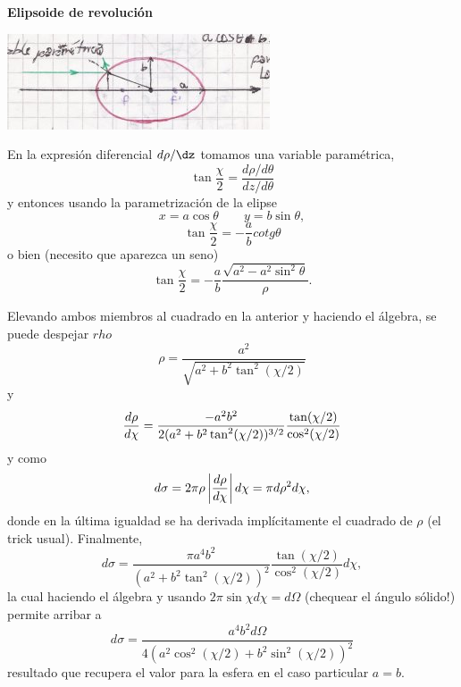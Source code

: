 \documentclass[10pt,oneside]{CBFT_book}
\begin{document}
\begin{ejemplo}{\bf Elipsoide de revolución}

\includegraphics[scale=0.5]{images/fig_mc_dispersion_elipsoide.jpg}  

En la expresión diferencial $d\rho/\dz$ tomamos una variable paramétrica,
\[
	\tan \frac{\chi}{2} = \frac{d\rho/d\theta}{dz/d\theta}
\]
y entonces usando la parametrización de la elipse 
\[
	x = a \cos \theta \qquad y = b \sin \theta,
\]
\[
	\tan \frac{\chi}{2} = - \frac{a}{b} cotg \theta
\]
o bien (necesito que aparezca un seno)
\[
	\tan \frac{\chi}{2} = - \frac{a}{b} \frac{\sqrt{a^2 - a^2 \sin^2 \theta}}{\rho}.
\]

Elevando ambos miembros al cuadrado en la anterior y haciendo el álgebra, se puede despejar
$rho$
\[
	\rho = \frac{ a^2 }{\sqrt{ a^2 + b^2 \tan^2 (\chi/2) }}
\]
y
\[
	\frac{d^{\hspace{-0.05em}} {\rho}}{d {\chi}^{\hspace{-0.05em}}} = \frac{ - a^2 b^2 }{2 ( a^2 + b^2 \tan^2 (\chi/2) )^{3/2} }
	\frac{\tan(\chi/2)}{\cos^2(\chi/2)}
\]
y como 
\[
	d\sigma = 2\pi \rho \left|\frac{d^{\hspace{-0.05em}} {\rho}}{d {\chi}^{\hspace{-0.05em}}}\right| d\chi = \pi d \rho^2 d\chi, 
\]
donde en la última igualdad se ha derivada implícitamente el cuadrado de $\rho$ (el trick usual).
Finalmente,
\[
	d\sigma = \frac{ \pi a^4 b^2 }{( a^2 + b^2 \tan^2 (\chi/2) )^{2} }
	\frac{\tan(\chi/2)}{\cos^2(\chi/2)} d\chi,
\]
la cual haciendo el álgebra y usando $2 \pi \sin \chi d\chi = d\Omega$ (chequear el ángulo sólido!) 
permite arribar a 
\[
	d\sigma = \frac{ a^4 b^2 d\Omega }{ 4 ( a^2 \cos^2 (\chi/2) + b^2 \sin^2 (\chi/2) )^2 }
\]
resultado que recupera el valor para la esfera en el caso particular $a=b$.
 
\end{ejemplo}
\end{document}
